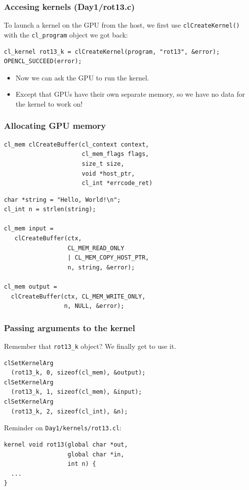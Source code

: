 \documentclass{beamer}
\begin{document}
\begin{frame}[fragile]
  \frametitle{Accesing kernels (Day1/rot13.c)}

  To launch a kernel on the GPU from the host, we first use
  \texttt{clCreateKernel()} with the \texttt{cl\_program} object we
  got back:

\begin{lstlisting}
cl_kernel rot13_k = clCreateKernel(program, "rot13", &error);
OPENCL_SUCCEED(error);
\end{lstlisting}

  \begin{itemize}
  \item Now we can ask the GPU to run the kernel.
  \item Except that GPUs have their own separate memory, so we have no
    data for the kernel to work on!
  \end{itemize}

\end{frame}

\begin{frame}
  \frametitle{Allocating GPU memory}

\begin{lstlisting}[backgroundcolor=\color{lightgray}]
cl_mem clCreateBuffer(cl_context context,
                      cl_mem_flags flags,
                      size_t size,
                      void *host_ptr,
                      cl_int *errcode_ret)
\end{lstlisting}

\begin{lstlisting}
char *string = "Hello, World!\n";
cl_int n = strlen(string);

cl_mem input =
   clCreateBuffer(ctx,
                  CL_MEM_READ_ONLY
                  | CL_MEM_COPY_HOST_PTR,
                  n, string, &error);

cl_mem output =
  clCreateBuffer(ctx, CL_MEM_WRITE_ONLY,
                 n, NULL, &error);
\end{lstlisting}

\end{frame}

\begin{frame}
  \frametitle{Passing arguments to the kernel}

  Remember that \texttt{rot13\_k} object?  We finally get to use it.

\begin{lstlisting}
clSetKernelArg
  (rot13_k, 0, sizeof(cl_mem), &output);
clSetKernelArg
  (rot13_k, 1, sizeof(cl_mem), &input);
clSetKernelArg
  (rot13_k, 2, sizeof(cl_int), &n);
\end{lstlisting}

Reminder on \texttt{Day1/kernels/rot13.cl}:

\begin{lstlisting}
kernel void rot13(global char *out,
                  global char *in,
                  int n) {
  ...
}
\end{lstlisting}

\end{frame}
\end{document}
